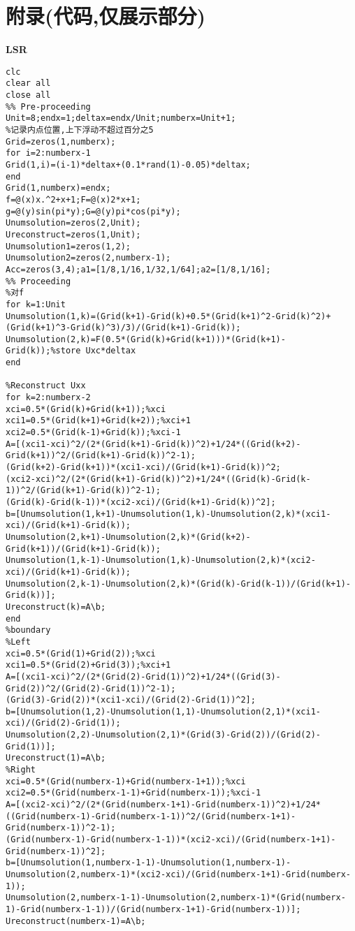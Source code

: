 \documentclass[a4paper,11pt,UTF8]{article}%
\theoremstyle{plain}
\begin{document}
	\clearpage
	\section{附录(代码,仅展示部分)}
	\noindent \textbf{LSR}
	\lstset{language=Matlab}%
	\lstset{breaklines}%
	\lstset{extendedchars=false}%
\begin{lstlisting}
clc
clear all
close all
%% Pre-proceeding
Unit=8;endx=1;deltax=endx/Unit;numberx=Unit+1;
%记录内点位置,上下浮动不超过百分之5
Grid=zeros(1,numberx);
for i=2:numberx-1
Grid(1,i)=(i-1)*deltax+(0.1*rand(1)-0.05)*deltax;
end
Grid(1,numberx)=endx;
f=@(x)x.^2+x+1;F=@(x)2*x+1;
g=@(y)sin(pi*y);G=@(y)pi*cos(pi*y);
Unumsolution=zeros(2,Unit);
Ureconstruct=zeros(1,Unit);
Unumsolution1=zeros(1,2);
Unumsolution2=zeros(2,numberx-1);
Acc=zeros(3,4);a1=[1/8,1/16,1/32,1/64];a2=[1/8,1/16];
%% Proceeding
%对f
for k=1:Unit
Unumsolution(1,k)=(Grid(k+1)-Grid(k)+0.5*(Grid(k+1)^2-Grid(k)^2)+(Grid(k+1)^3-Grid(k)^3)/3)/(Grid(k+1)-Grid(k));
Unumsolution(2,k)=F(0.5*(Grid(k)+Grid(k+1)))*(Grid(k+1)-Grid(k));%store Uxc*deltax
end
		
%Reconstruct Uxx
for k=2:numberx-2
xci=0.5*(Grid(k)+Grid(k+1));%xci
xci1=0.5*(Grid(k+1)+Grid(k+2));%xci+1
xci2=0.5*(Grid(k-1)+Grid(k));%xci-1
A=[(xci1-xci)^2/(2*(Grid(k+1)-Grid(k))^2)+1/24*((Grid(k+2)-Grid(k+1))^2/(Grid(k+1)-Grid(k))^2-1);
(Grid(k+2)-Grid(k+1))*(xci1-xci)/(Grid(k+1)-Grid(k))^2;
(xci2-xci)^2/(2*(Grid(k+1)-Grid(k))^2)+1/24*((Grid(k)-Grid(k-1))^2/(Grid(k+1)-Grid(k))^2-1);
(Grid(k)-Grid(k-1))*(xci2-xci)/(Grid(k+1)-Grid(k))^2];
b=[Unumsolution(1,k+1)-Unumsolution(1,k)-Unumsolution(2,k)*(xci1-xci)/(Grid(k+1)-Grid(k));
Unumsolution(2,k+1)-Unumsolution(2,k)*(Grid(k+2)-Grid(k+1))/(Grid(k+1)-Grid(k));
Unumsolution(1,k-1)-Unumsolution(1,k)-Unumsolution(2,k)*(xci2-xci)/(Grid(k+1)-Grid(k));
Unumsolution(2,k-1)-Unumsolution(2,k)*(Grid(k)-Grid(k-1))/(Grid(k+1)-Grid(k))];
Ureconstruct(k)=A\b;
end
%boundary
%Left
xci=0.5*(Grid(1)+Grid(2));%xci
xci1=0.5*(Grid(2)+Grid(3));%xci+1
A=[(xci1-xci)^2/(2*(Grid(2)-Grid(1))^2)+1/24*((Grid(3)-Grid(2))^2/(Grid(2)-Grid(1))^2-1);
(Grid(3)-Grid(2))*(xci1-xci)/(Grid(2)-Grid(1))^2];
b=[Unumsolution(1,2)-Unumsolution(1,1)-Unumsolution(2,1)*(xci1-xci)/(Grid(2)-Grid(1));
Unumsolution(2,2)-Unumsolution(2,1)*(Grid(3)-Grid(2))/(Grid(2)-Grid(1))];    
Ureconstruct(1)=A\b;
%Right    
xci=0.5*(Grid(numberx-1)+Grid(numberx-1+1));%xci
xci2=0.5*(Grid(numberx-1-1)+Grid(numberx-1));%xci-1    
A=[(xci2-xci)^2/(2*(Grid(numberx-1+1)-Grid(numberx-1))^2)+1/24*((Grid(numberx-1)-Grid(numberx-1-1))^2/(Grid(numberx-1+1)-Grid(numberx-1))^2-1);
(Grid(numberx-1)-Grid(numberx-1-1))*(xci2-xci)/(Grid(numberx-1+1)-Grid(numberx-1))^2];
b=[Unumsolution(1,numberx-1-1)-Unumsolution(1,numberx-1)-Unumsolution(2,numberx-1)*(xci2-xci)/(Grid(numberx-1+1)-Grid(numberx-1));
Unumsolution(2,numberx-1-1)-Unumsolution(2,numberx-1)*(Grid(numberx-1)-Grid(numberx-1-1))/(Grid(numberx-1+1)-Grid(numberx-1))];   
Ureconstruct(numberx-1)=A\b;
		

\end{lstlisting}
\end{document}
